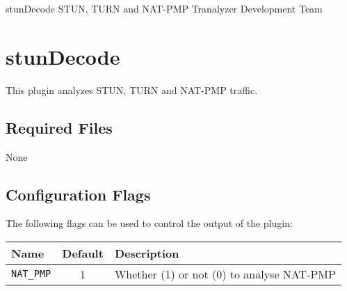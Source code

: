\documentclass[documentation]{subfiles}
\begin{document}
\trantitle
    {stunDecode}
    {STUN, TURN and NAT-PMP}
    {Tranalyzer Development Team}

\section{stunDecode}\label{s:stunDecode}
This plugin analyzes STUN, TURN and NAT-PMP traffic.

\subsection{Required Files}
None

\subsection{Configuration Flags}
The following flags can be used to control the output of the plugin:
\begin{longtable}{lcl}
    \toprule
    {\bf Name} & {\bf Default} & {\bf Description} \\
    \midrule\endhead%
    {\tt NAT\_PMP} & 1 & Whether (1) or not (0) to analyse NAT-PMP\\
    \bottomrule
\end{longtable}
\end{document}
